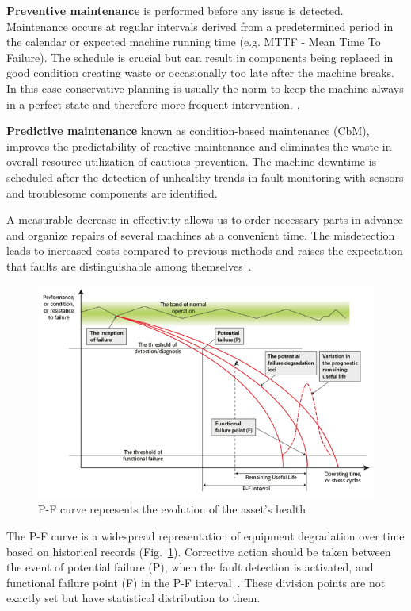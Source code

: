 \textbf{Preventive maintenance} is performed before any issue is detected. Maintenance occurs at regular intervals derived from a predetermined period in the calendar or expected machine running time (e.g. MTTF - Mean Time To Failure). The schedule is crucial but can result in components being replaced in good condition creating waste or occasionally too late after the machine breaks. In this case conservative planning is usually the norm to keep the machine always in a perfect state and therefore more frequent intervention. \cite{mohanty_machinery_2015}.
\bigbreak

\textbf{Predictive maintenance} known as condition-based maintenance (CbM), improves the predictability of reactive maintenance and eliminates the waste in overall resource utilization of cautious prevention. The machine downtime is scheduled after the detection of unhealthy trends in fault monitoring with sensors and troublesome components are identified.

A measurable decrease in effectivity allows us to order necessary parts in advance and organize repairs of several machines at a convenient time. The misdetection leads to increased costs compared to previous methods and raises the expectation that faults are distinguishable among themselves~\cite{davies_handbook_2012}.
\bigbreak

\begin{figure}[h]
	\centering
	\includegraphics[width=\textwidth]{assets/P-F-Curve.png}
	\caption{P-F curve represents the evolution of the asset's health \cite{jennions_integrated_2011}}
	\label{fig:p-f-curve}
\end{figure}

The P-F curve is a widespread representation of equipment degradation over time based on historical records (Fig.~\ref{fig:p-f-curve}). Corrective action should be taken between the event of potential failure (P), when the fault detection is activated, and functional failure point (F) in the P-F interval~\cite{bousdekis_enterprise_2021}.  These division points are not exactly set but have statistical distribution to them.

